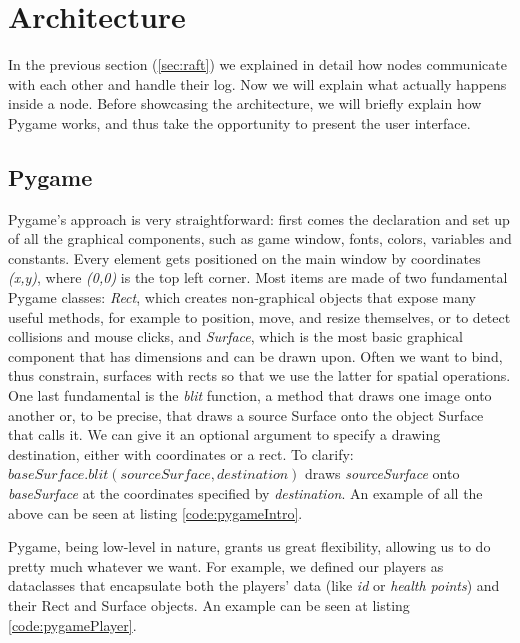 \section{Architecture} \label{sec:raftian}

In the previous section (\ref{sec:raft}) we explained in detail how nodes communicate with each other and handle their log. Now we will explain what actually happens inside a node. Before showcasing the architecture, we will briefly explain how Pygame works, and thus take the opportunity to present the user interface.

\subsection{Pygame} 

Pygame's approach is very straightforward: first comes the declaration and set up of all the graphical components, such as game window, fonts, colors, variables and constants. Every element gets positioned on the main window by coordinates \textit{(x,y)}, where \textit{(0,0)} is the top left corner. Most items are made of two fundamental Pygame classes: \textit{Rect}, which creates non-graphical objects that expose many useful methods, for example to position, move, and resize themselves, or to detect collisions and mouse clicks, and \textit{Surface}, which is the most basic graphical component that has dimensions and can be drawn upon. Often we want to bind, thus constrain, surfaces with rects so that we use the latter for spatial operations. One last fundamental is the \textit{blit} function, a method that draws one image onto another or, to be precise, that draws a source Surface onto the object Surface that calls it. We can give it an optional argument to specify a drawing destination, either with coordinates or a rect. To clarify: $baseSurface.blit(sourceSurface,destination)$ draws \textit{sourceSurface} onto \textit{baseSurface} at the coordinates specified by \textit{destination}. An example of all the above can be seen at listing \ref{code:pygameIntro}.

Pygame, being low-level in nature, grants us great flexibility, allowing us to do pretty much whatever we want. For example, we defined our players as dataclasses that encapsulate both the players' data (like \textit{id} or \textit{health points}) and their Rect and Surface objects. An example can be seen at listing \ref{code:pygamePlayer}.

